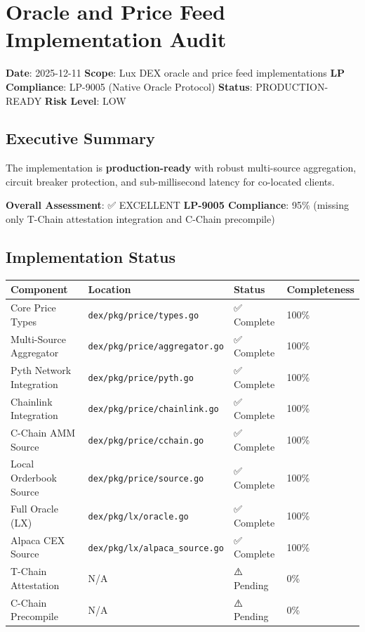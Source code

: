 \documentclass[
]{article}
\author{}
\date{}
\newcounter{none} %
\begin{document}
\section{Oracle and Price Feed Implementation
Audit}\label{oracle-and-price-feed-implementation-audit}

\textbf{Date}: 2025-12-11 \textbf{Scope}: Lux DEX oracle and price feed
implementations \textbf{LP Compliance}: LP-9005 (Native Oracle Protocol)
\textbf{Status}: PRODUCTION-READY \textbf{Risk Level}: LOW

\subsection{Executive Summary}\label{executive-summary}

The implementation is \textbf{production-ready} with robust multi-source
aggregation, circuit breaker protection, and sub-millisecond latency for
co-located clients.

\textbf{Overall Assessment}: ✅ EXCELLENT \textbf{LP-9005 Compliance}:
95\% (missing only T-Chain attestation integration and C-Chain
precompile)

\subsection{Implementation Status}\label{implementation-status}

{\def\LTcaptype{none} %
\begin{longtable}[]{@{}llll@{}}
\toprule\noalign{}
Component & Location & Status & Completeness \\
\midrule\noalign{}
\endhead
\bottomrule\noalign{}
\endlastfoot
Core Price Types & \texttt{dex/pkg/price/types.go} & ✅ Complete &
100\% \\
Multi-Source Aggregator & \texttt{dex/pkg/price/aggregator.go} & ✅
Complete & 100\% \\
Pyth Network Integration & \texttt{dex/pkg/price/pyth.go} & ✅ Complete
& 100\% \\
Chainlink Integration & \texttt{dex/pkg/price/chainlink.go} & ✅
Complete & 100\% \\
C-Chain AMM Source & \texttt{dex/pkg/price/cchain.go} & ✅ Complete &
100\% \\
Local Orderbook Source & \texttt{dex/pkg/price/source.go} & ✅ Complete
& 100\% \\
Full Oracle (LX) & \texttt{dex/pkg/lx/oracle.go} & ✅ Complete &
100\% \\
Alpaca CEX Source & \texttt{dex/pkg/lx/alpaca\_source.go} & ✅ Complete
& 100\% \\
T-Chain Attestation & N/A & ⚠️ Pending & 0\% \\
C-Chain Precompile & N/A & ⚠️ Pending & 0\% \\
\end{longtable}
}
\end{document}
